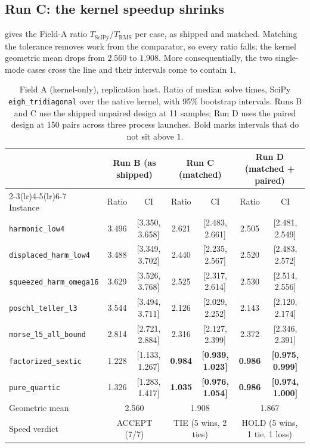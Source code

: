 \documentclass[twocolumn,10pt,a4paper]{article}
\theoremstyle{plain}
\theoremstyle{definition}
\newcommand{\ACCEPT}{\textsf{ACCEPT}}
\newcommand{\HOLD}{\textsf{HOLD}}
\begin{document}
\subsection{Run C: the kernel speedup shrinks}

 gives the Field-A ratio $T_{\mathrm{SciPy}}/T_{\mathrm{RMS}}$
per case, as shipped and matched. Matching the tolerance removes work from the
comparator, so every ratio falls; the kernel geometric mean drops from $2.560$
to $1.908$. More consequentially, the two single-mode cases cross the line and
their intervals come to contain $1$.

\begin{table}[t]
\centering\small
\caption{Field A (kernel-only), replication host. Ratio of median solve times,
SciPy \texttt{eigh\_tridiagonal} over the native kernel, with 95\% bootstrap
intervals. Runs B and C use the shipped unpaired design at 11 samples; Run D
uses the paired design at 150 pairs across three process launches. Bold marks
intervals that do not sit above $1$.}
\label{tab:kernel}
\begin{tabular}{lcccccc}
\toprule
& \multicolumn{2}{c}{Run B (as shipped)} & \multicolumn{2}{c}{Run C (matched)}
& \multicolumn{2}{c}{Run D (matched + paired)}\\
\cmidrule(lr){2-3}\cmidrule(lr){4-5}\cmidrule(lr){6-7}
Instance & Ratio & CI & Ratio & CI & Ratio & CI \\
\midrule
\texttt{harmonic\_low4}          & 3.496 & [3.350, 3.658] & 2.621 & [2.483, 2.661] & 2.505 & [2.481, 2.549]\\
\texttt{displaced\_harm\_low4}   & 3.488 & [3.349, 3.702] & 2.440 & [2.235, 2.567] & 2.520 & [2.483, 2.572]\\
\texttt{squeezed\_harm\_omega16} & 3.629 & [3.526, 3.768] & 2.525 & [2.317, 2.614] & 2.530 & [2.514, 2.556]\\
\texttt{poschl\_teller\_l3}      & 3.544 & [3.494, 3.711] & 2.126 & [2.029, 2.252] & 2.143 & [2.120, 2.174]\\
\texttt{morse\_l5\_all\_bound}   & 2.814 & [2.721, 2.884] & 2.316 & [2.127, 2.399] & 2.372 & [2.346, 2.391]\\
\texttt{factorized\_sextic}      & 1.228 & [1.133, 1.267] & \textbf{0.984} & \textbf{[0.939, 1.023]} & \textbf{0.986} & \textbf{[0.975, 0.999]}\\
\texttt{pure\_quartic}           & 1.326 & [1.283, 1.417] & \textbf{1.035} & \textbf{[0.976, 1.054]} & \textbf{0.986} & \textbf{[0.974, 1.000]}\\
\midrule
Geometric mean & \multicolumn{2}{c}{2.560} & \multicolumn{2}{c}{1.908} & \multicolumn{2}{c}{1.867}\\
Speed verdict & \multicolumn{2}{c}{\ACCEPT{} (7/7)} & \multicolumn{2}{c}{\textsf{TIE} (5 wins, 2 ties)}
& \multicolumn{2}{c}{\HOLD{} (5 wins, 1 tie, 1 loss)}\\
\bottomrule
\end{tabular}
\end{table}
\end{document}
